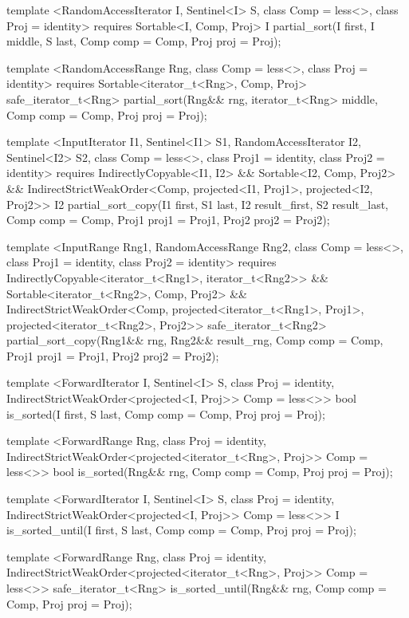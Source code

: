 {\begin{codeblock}
{{    template <RandomAccessIterator I, Sentinel<I> S, class Comp = less<>,
        class Proj = identity>
      requires Sortable<I, Comp, Proj>
      I partial_sort(I first, I middle, S last, Comp comp = Comp{}, Proj proj = Proj{});

    template <RandomAccessRange Rng, class Comp = less<>, class Proj = identity>
      requires Sortable<iterator_t<Rng>, Comp, Proj>
      safe_iterator_t<Rng>
        partial_sort(Rng&& rng, iterator_t<Rng> middle, Comp comp = Comp{},
                    Proj proj = Proj{});

    template <InputIterator I1, Sentinel<I1> S1, RandomAccessIterator I2, Sentinel<I2> S2,
        class Comp = less<>, class Proj1 = identity, class Proj2 = identity>
      requires IndirectlyCopyable<I1, I2> && Sortable<I2, Comp, Proj2> &&
          IndirectStrictWeakOrder<Comp, projected<I1, Proj1>, projected<I2, Proj2>>
      I2 partial_sort_copy(I1 first, S1 last, I2 result_first, S2 result_last,
                           Comp comp = Comp{}, Proj1 proj1 = Proj1{}, Proj2 proj2 = Proj2{});

    template <InputRange Rng1, RandomAccessRange Rng2, class Comp = less<>,
        class Proj1 = identity, class Proj2 = identity>
      requires IndirectlyCopyable<iterator_t<Rng1>, iterator_t<Rng2>> &&
          Sortable<iterator_t<Rng2>, Comp, Proj2> &&
          IndirectStrictWeakOrder<Comp, projected<iterator_t<Rng1>, Proj1>,
            projected<iterator_t<Rng2>, Proj2>>
      safe_iterator_t<Rng2>
        partial_sort_copy(Rng1&& rng, Rng2&& result_rng, Comp comp = Comp{},
                          Proj1 proj1 = Proj1{}, Proj2 proj2 = Proj2{});

    template <ForwardIterator I, Sentinel<I> S, class Proj = identity,
        IndirectStrictWeakOrder<projected<I, Proj>> Comp = less<>>
      bool is_sorted(I first, S last, Comp comp = Comp{}, Proj proj = Proj{});

    template <ForwardRange Rng, class Proj = identity,
        IndirectStrictWeakOrder<projected<iterator_t<Rng>, Proj>> Comp = less<>>
      bool is_sorted(Rng&& rng, Comp comp = Comp{}, Proj proj = Proj{});

    template <ForwardIterator I, Sentinel<I> S, class Proj = identity,
        IndirectStrictWeakOrder<projected<I, Proj>> Comp = less<>>
      I is_sorted_until(I first, S last, Comp comp = Comp{}, Proj proj = Proj{});

    template <ForwardRange Rng, class Proj = identity,
        IndirectStrictWeakOrder<projected<iterator_t<Rng>, Proj>> Comp = less<>>
      safe_iterator_t<Rng>
        is_sorted_until(Rng&& rng, Comp comp = Comp{}, Proj proj = Proj{});

}}
\end{codeblock}}
